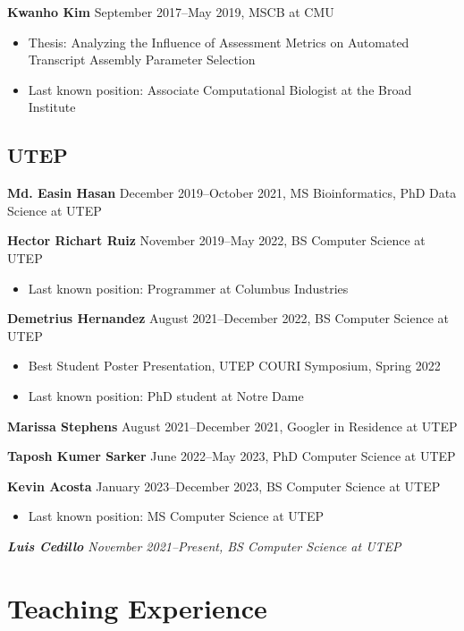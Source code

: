 \documentclass[10pt,letterpaper]{article}
\begin{document}
\textbf{Kwanho Kim} September 2017--May 2019, MSCB at CMU
\begin{itemize}
\item Thesis: Analyzing the Influence of Assessment Metrics on Automated Transcript Assembly Parameter Selection
\item Last known position: Associate Computational Biologist at the Broad Institute 
\end{itemize}

\subsection*{UTEP}
\hspace{1.5em}\textbf{Md. Easin Hasan} December 2019--October 2021, MS Bioinformatics, PhD Data Science at UTEP

\textbf{Hector Richart Ruiz} November 2019--May 2022, BS Computer Science at UTEP
\begin{itemize}
\item Last known position: Programmer at Columbus Industries
\end{itemize}

\textbf{Demetrius Hernandez} August 2021--December 2022, BS Computer Science at UTEP
\begin{itemize}
\item Best Student Poster Presentation, UTEP COURI Symposium, Spring 2022 
\item Last known position: PhD student at Notre Dame
\end{itemize}

\textbf{Marissa Stephens} August 2021--December 2021, Googler in Residence at UTEP

\textbf{Taposh Kumer Sarker} June 2022--May 2023, PhD Computer Science at UTEP

\textbf{Kevin Acosta} January 2023--December 2023, BS Computer Science at UTEP
\begin{itemize}
\item Last known position: MS Computer Science at UTEP
\end{itemize}

\textit{\textbf{Luis Cedillo} November 2021--Present, BS Computer Science at UTEP}



\section*{Teaching Experience}
\end{document}
